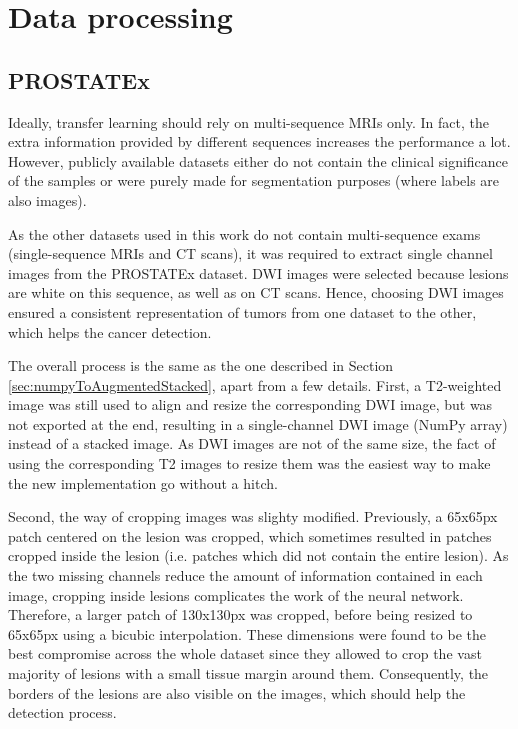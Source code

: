 \section{Data processing}
\label{sec:tl_data_processing}
\subsection{PROSTATEx}
\label{sec:PROSTATEx}
\setlength{\marginparwidth}{3cm}\leavevmode {}Ideally, transfer learning should rely on multi-sequence MRIs only. In fact, the extra information provided by different sequences increases the performance a lot. However, publicly available datasets either do not contain the clinical significance of the samples or were purely made for segmentation purposes (where labels are also images).

As the other datasets used in this work do not contain multi-sequence exams (single-sequence MRIs and CT scans), it was required to extract single channel images from the PROSTATEx dataset. DWI images were selected because lesions are white on this sequence, as well as on CT scans. Hence, choosing DWI images ensured a consistent representation of tumors from one dataset to the other, which helps the cancer detection.

The overall process is the same as the one described in Section \ref{sec:numpyToAugmentedStacked}, apart from a few details. First, a T2-weighted image was still used to align and resize the corresponding DWI image, but was not exported at the end, resulting in a single-channel DWI image (NumPy array) instead of a stacked image. As DWI images are not of the same size, the fact of using the corresponding T2 images to resize them was the easiest way to make the new implementation go without a hitch.

Second, the way of cropping images was slighty modified. Previously, a 65x65px patch centered on the lesion was cropped, which sometimes resulted in patches cropped inside the lesion (i.e. patches which did not contain the entire lesion). As the two missing channels reduce the amount of information contained in each image, cropping inside lesions complicates the work of the neural network. Therefore, a larger patch of 130x130px was cropped, before being resized to 65x65px using a bicubic interpolation. These dimensions were found to be the best compromise across the whole dataset since they allowed to crop the vast majority of lesions with a small tissue margin around them. Consequently, the borders of the lesions are also visible on the images, which should help the detection process. 


